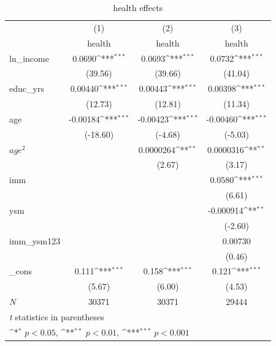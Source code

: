 \documentclass[11pt]{article}
\begin{document}
{
\begin{table}[ht]
\caption{health effects}
\centering
\def\sym#1{\ifmmode^{#1}\else\(^{#1}\)\fi}
\begin{tabular}{l*{3}{c}}
\hline\hline
            &\multicolumn{1}{c}{(1)}&\multicolumn{1}{c}{(2)}&\multicolumn{1}{c}{(3)}\\
            &\multicolumn{1}{c}{health}&\multicolumn{1}{c}{health}&\multicolumn{1}{c}{health}\\
\hline
ln\_income   &      0.0690\sym{***}&      0.0693\sym{***}&      0.0732\sym{***}\\
            &     (39.56)         &     (39.66)         &     (41.04)         \\
[1em]
educ\_yrs    &     0.00440\sym{***}&     0.00443\sym{***}&     0.00398\sym{***}\\
            &     (12.73)         &     (12.81)         &     (11.34)         \\
[1em]
age         &    -0.00184\sym{***}&    -0.00423\sym{***}&    -0.00460\sym{***}\\
            &    (-18.60)         &     (-4.68)         &     (-5.03)         \\
[1em]
$age^{2}$ &                     &   0.0000264\sym{**} &   0.0000316\sym{**} \\
            &                     &      (2.67)         &      (3.17)         \\
[1em]
imm         &                     &                     &      0.0580\sym{***}\\
            &                     &                     &      (6.61)         \\
[1em]
ysm         &                     &                     &   -0.000914\sym{**} \\
            &                     &                     &     (-2.60)         \\
[1em]
imm\_ysm123  &                     &                     &     0.00730         \\
            &                     &                     &      (0.46)         \\
[1em]
\_cons      &       0.111\sym{***}&       0.158\sym{***}&       0.121\sym{***}\\
            &      (5.67)         &      (6.00)         &      (4.53)         \\
\hline
\(N\)       &       30371         &       30371         &       29444         \\
\hline\hline
\multicolumn{4}{l}{\footnotesize \textit{t} statistics in parentheses}\\
\multicolumn{4}{l}{\footnotesize \sym{*} \(p<0.05\), \sym{**} \(p<0.01\), \sym{***} \(p<0.001\)}\\
\end{tabular}
\end{table}
}
\end{document}
